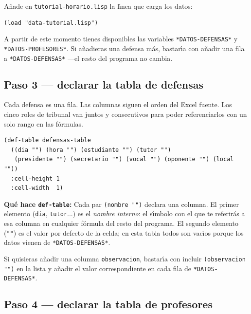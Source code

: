 \documentclass[12pt,a4paper]{report}
\begin{document}
A\~nade en \texttt{tutorial-horario.lisp} la l\'{\i}nea que carga los datos:

\begin{lstlisting}[caption={tutorial-horario.lisp --- cargar datos.},
                   firstnumber=2]
(load "data-tutorial.lisp")
\end{lstlisting}

A partir de este momento tienes disponibles las variables
\texttt{*DATOS-DEFENSAS*} y \texttt{*DATOS-PROFESORES*}.
Si a\~nadieras una defensa m\'as, bastar\'{\i}a con a\~nadir una fila
a \texttt{*DATOS-DEFENSAS*} ---el resto del programa no cambia.

\subsection{Paso 3 --- declarar la tabla de defensas}

Cada defensa es una fila.
Las columnas siguen el orden del Excel fuente.
Los cinco roles de tribunal van juntos y consecutivos para poder
referenciarlos con un solo rango en las f\'ormulas.

\begin{lstlisting}[caption={tutorial-horario.lisp --- tabla de defensas.},
                   firstnumber=4]
(def-table defensas-table
  ((dia "") (hora "") (estudiante "") (tutor "")
   (presidente "") (secretario "") (vocal "") (oponente "") (local ""))
  :cell-height 1
  :cell-width  1)
\end{lstlisting}

\textbf{Qu\'e hace \texttt{def-table}:}
Cada par \texttt{(nombre "")} declara una columna.
El primer elemento (\texttt{dia}, \texttt{tutor}...) es el \emph{nombre
interno}: el s\'{\i}mbolo con el que te referir\'as a esa columna en
cualquier f\'ormula del resto del programa.
El segundo elemento (\texttt{""}) es el valor por defecto de la celda;
en esta tabla todos son vac\'{\i}os porque los datos vienen de
\texttt{*DATOS-DEFENSAS*}.

Si quisieras a\~nadir una columna \texttt{observacion}, bastar\'{\i}a con
incluir \texttt{(observacion "")} en la lista y a\~nadir el valor
correspondiente en cada fila de \texttt{*DATOS-DEFENSAS*}.

\subsection{Paso 4 --- declarar la tabla de profesores}
\end{document}
